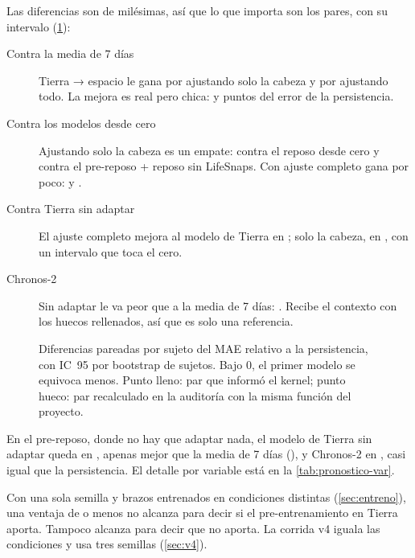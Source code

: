 Las diferencias son de milésimas, así que lo que importa son los pares, con su intervalo (\cref{fig:pares}):
\begin{description}
\item[Contra la media de 7 días] Tierra → espacio le gana por  
  ajustando solo la cabeza y por   ajustando todo. La mejora es
  real pero chica:  y  puntos del error de la
  persistencia.
\item[Contra los modelos desde cero] Ajustando solo la cabeza es un empate: 
   contra el reposo desde cero y  
  contra el pre-reposo + reposo sin LifeSnaps. Con ajuste completo gana por poco: 
   y  .
\item[Contra Tierra sin adaptar] El ajuste completo mejora al modelo de Tierra en 
  ; solo la cabeza, en  , con un
  intervalo que toca el cero.
\item[Chronos-2] Sin adaptar le va peor que a la media de 7 días: 
  . Recibe el contexto con los huecos rellenados, así que es solo una referencia.
\end{description}

\begin{figure}[htbp]
\centering

\caption[Diferencias pareadas del pronóstico]{Diferencias pareadas por sujeto del MAE relativo a la persistencia, con
IC~95\pct{} por bootstrap de sujetos. Bajo 0, el primer modelo se equivoca menos. Punto lleno: par que informó el
kernel; punto hueco: par recalculado en la auditoría con la misma función del proyecto.}
\label{fig:pares}
\end{figure}

En el pre-reposo, donde no hay que adaptar nada, el modelo de Tierra sin adaptar queda en ,
apenas mejor que la media de 7 días (), y Chronos-2 en , casi igual que
la persistencia. El detalle por variable está en la \cref{tab:pronostico-var}.

\begin{cuidado}
Con una sola semilla y brazos entrenados en condiciones distintas (\cref{sec:entreno}), una ventaja de
 o menos no alcanza para decir si el pre-entrenamiento en Tierra aporta. Tampoco alcanza para decir que no
aporta. La corrida v4 iguala las condiciones y usa tres semillas (\cref{sec:v4}).
\end{cuidado}

